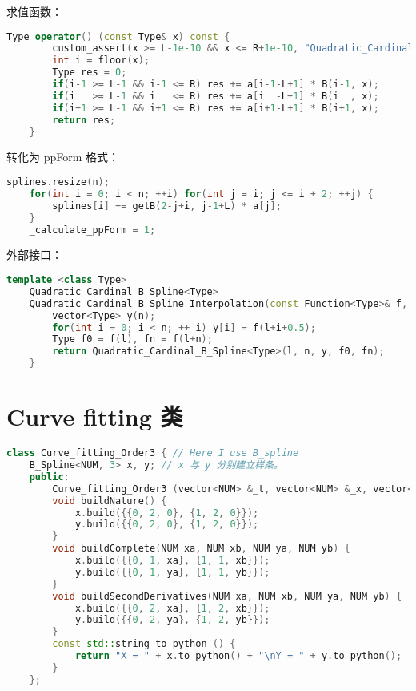 \documentclass[lang=cn,a4paper,newtx,bibend=bibtex]{elegantpaper}
\begin{document}
求值函数：

\begin{lstlisting}[language=C++]
    Type operator() (const Type& x) const {
		custom_assert(x >= L-1e-10 && x <= R+1e-10, "Quadratic_Cardinal_B_Spline : Input x out of range.");
		int i = floor(x);
		Type res = 0;
		if(i-1 >= L-1 && i-1 <= R) res += a[i-1-L+1] * B(i-1, x);
		if(i   >= L-1 && i   <= R) res += a[i  -L+1] * B(i  , x);
		if(i+1 >= L-1 && i+1 <= R) res += a[i+1-L+1] * B(i+1, x);
		return res;
	}
\end{lstlisting}

转化为 ppForm 格式：
\begin{lstlisting}[language=C++]
    splines.resize(n);
	for(int i = 0; i < n; ++i) for(int j = i; j <= i + 2; ++j) {
 		splines[i] += getB(2-j+i, j-1+L) * a[j];
	}
	_calculate_ppForm = 1;
\end{lstlisting}

外部接口：

\begin{lstlisting}[language=C++]
    template <class Type>
    Quadratic_Cardinal_B_Spline<Type> 
    Quadratic_Cardinal_B_Spline_Interpolation(const Function<Type>& f, const int& l, const int& n) {
    	vector<Type> y(n);
    	for(int i = 0; i < n; ++ i) y[i] = f(l+i+0.5);
    	Type f0 = f(l), fn = f(l+n);
    	return Quadratic_Cardinal_B_Spline<Type>(l, n, y, f0, fn);
    }
\end{lstlisting}

\section{Curve fitting 类}

\begin{lstlisting}[language=C++]
    class Curve_fitting_Order3 { // Here I use B_spline
	B_Spline<NUM, 3> x, y; // x 与 y 分别建立样条。
    public:
    	Curve_fitting_Order3 (vector<NUM> &_t, vector<NUM> &_x, vector<NUM> &_y) : x(_t, _x), y(_t, _y) {}
    	void buildNature() {
    		x.build({{0, 2, 0}, {1, 2, 0}});
    		y.build({{0, 2, 0}, {1, 2, 0}});
    	}
    	void buildComplete(NUM xa, NUM xb, NUM ya, NUM yb) {
    		x.build({{0, 1, xa}, {1, 1, xb}});
    		y.build({{0, 1, ya}, {1, 1, yb}});	
    	}
    	void buildSecondDerivatives(NUM xa, NUM xb, NUM ya, NUM yb) {
    		x.build({{0, 2, xa}, {1, 2, xb}});
    		y.build({{0, 2, ya}, {1, 2, yb}});	
    	}
    	const std::string to_python () {
            return "X = " + x.to_python() + "\nY = " + y.to_python();
        }
    };
\end{lstlisting}



\nocite{*}
\printbibliography[heading=bibintoc, title=\ebibname]

\end{document}
